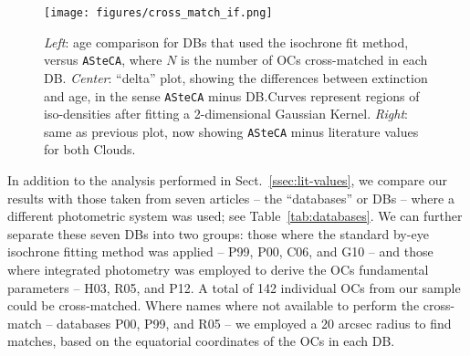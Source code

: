 \documentclass{aa}
\begin{document}
\begin{figure*}
\texttt{[image: figures/cross\_match\_if.png]}
\caption{\emph{Left}: age comparison for DBs that used the isochrone fit
method, versus \texttt{ASteCA}, where $N$ is the number of OCs cross-matched in
each DB.\@
\emph{Center}: ``delta'' plot, showing the differences between extinction
and age, in the sense \texttt{ASteCA} minus DB.\@ Curves represent regions of
iso-densities after fitting a 2-dimensional Gaussian Kernel.
\emph{Right}: same as previous plot, now showing \texttt{ASteCA} minus
literature values for both Clouds.}
\label{fig:cross_match_if}
\end{figure*}

In addition to the analysis performed in Sect.~\ref{ssec:lit-values}, we compare
our results with those taken from seven articles -- the ``databases'' or DBs --
where a different photometric system was used; see Table~\ref{tab:databases}.
%
We can further separate these seven DBs into two groups: those where the
standard by-eye isochrone fitting method was applied -- P99, P00, C06, and G10
-- and those where integrated photometry was employed to derive the OCs
fundamental parameters -- H03, R05, and P12.
%
A total of 142 individual OCs from our sample could be cross-matched. Where
names where not available to perform the cross-match -- databases P00, P99, and
R05 -- we employed a 20 arcsec radius to find matches, based on the equatorial
coordinates of the OCs in each DB.
\end{document}
